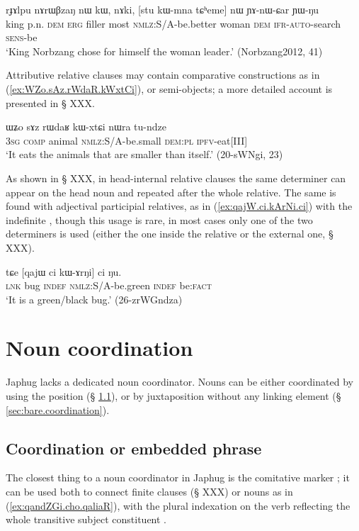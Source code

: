 \begin{exe}
\ex \label{ex:stu.kWmna.tCheme}
\gll  rɟɤlpu nɤrɯβzaŋ nɯ kɯ, nɤki, [stu kɯ-mna tɕʰeme] nɯ ɲɤ-nɯ-ɕar ɲɯ-ŋu \\
king p.n. \textsc{dem} \textsc{erg} filler most \textsc{nmlz}:S/A-be.better woman \textsc{dem} \textsc{ifr}-\textsc{auto}-search \textsc{sens}-be \\
\glt `King Norbzang chose for himself the woman leader.' (Norbzang2012, 41)
\end{exe} 


Attributive relative clauses may contain comparative constructions as in (\ref{ex:WZo.sAz.rWdaR.kWxtCi}), or semi-objects; a more detailed account is presented in § XXX.

\begin{exe}
\ex \label{ex:WZo.sAz.rWdaR.kWxtCi}
\gll ɯʑo sɤz rɯdaʁ kɯ-xtɕi nɯra tu-ndze \\
\textsc{3sg} \textsc{comp} animal \textsc{nmlz}:S/A-be.small \textsc{dem}:\textsc{pl} \textsc{ipfv}-eat[III] \\
\glt `It eats the animals that are smaller than itself.' (20-sWNgi, 23)
\end{exe}

As shown in § XXX, in head-internal relative clauses the same determiner can appear on the head noun and repeated after the whole relative. The same is found with adjectival participial relatives, as in (\ref{ex:qajW.ci.kArNi.ci}) with the indefinite , though this usage is rare, in most cases only one of the two determiners is used (either the one inside the relative or the external one, § XXX).

\begin{exe}
\ex \label{ex:qajW.ci.kArNi.ci}
\gll tɕe [qajɯ ci kɯ-ɤrŋi] ci ŋu. \\
\textsc{lnk} bug \textsc{indef} \textsc{nmlz}:S/A-be.green \textsc{indef} be:\textsc{fact} \\
\glt `It is a green/black bug.' (26-zrWGndza)
\end{exe}

 \section{Noun coordination}
Japhug lacks a dedicated noun coordinator. Nouns can be either coordinated by using the position  (§ \ref{sec:coordinator.cho}), or by  juxtaposition without any linking element (§ \ref{sec:bare.coordination}). 

\subsection{Coordination or embedded phrase} \label{sec:coordinator.cho}
The closest thing to a noun coordinator in Japhug is the comitative marker ; it can be used both to connect finite clauses (§ XXX) or nouns as in (\ref{ex:qandZGi.cho.qaliaR}), with the plural indexation on the verb reflecting the whole transitive subject constituent .

